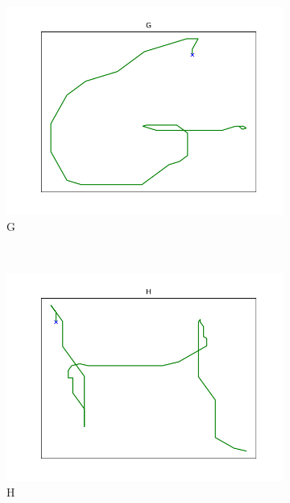 \begin{figure}
\begin{subfigure}[b]{0.14\textwidth}
        \includegraphics[width=\textwidth]{images/gbem/orig_letters_fig/AORIG_letter_G_writer_5.png}
        \caption{G}
    \end{subfigure}
    ~
    \begin{subfigure}[b]{0.14\textwidth}
        \includegraphics[width=\textwidth]{images/gbem/orig_letters_fig/AORIG_letter_H_writer_16.png}
        \caption{H}
    \end{subfigure}
    ~
    \begin{subfigure}[b]{0.14\textwidth}

\end{subfigure}
\end{figure}
